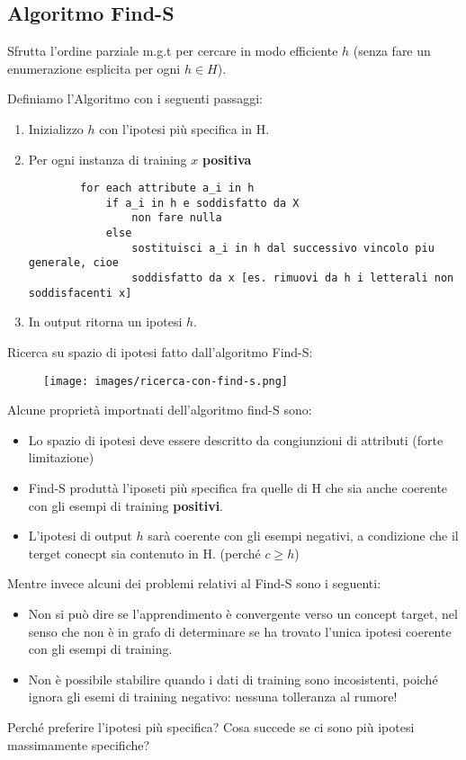 \subsection{Algoritmo Find-S}
Sfrutta l'ordine parziale m.g.t per cercare in modo efficiente $h$ (senza fare un enumerazione esplicita per ogni $h \in H$).
\begin{definition}
    Definiamo l'Algoritmo con i seguenti passaggi:
    \begin{enumerate}
        \item Inizializzo $h$ con l'ipotesi più specifica in H.
        \item Per ogni instanza di training $x$ \textbf{positiva}
        \begin{lstlisting}
        for each attribute a_i in h
            if a_i in h e soddisfatto da X
                non fare nulla
            else
                sostituisci a_i in h dal successivo vincolo piu generale, cioe
                soddisfatto da x [es. rimuovi da h i letterali non soddisfacenti x]
        \end{lstlisting}
        \item In output ritorna un ipotesi $h$.
    \end{enumerate}
\end{definition}
Ricerca su spazio di ipotesi fatto dall'algoritmo Find-S:
\begin{figure}[h!]
    \centering
    \texttt{[image: images/ricerca-con-find-s.png]}
\end{figure}

\hspace{-15pt}Alcune proprietà importnati dell'algoritmo find-S sono:
\begin{itemize}
    \item Lo spazio di ipotesi deve essere descritto da congiunzioni di attributi (forte limitazione)
    \item Find-S produttà l'iposeti più specifica fra quelle di H che sia anche coerente con gli esempi di training \textbf{positivi}.
    \item L'ipotesi di output $h$ sarà coerente con gli esempi negativi, a condizione che il terget conecpt sia contenuto in H. (perché $c \geq h$)
\end{itemize}
Mentre invece alcuni dei problemi relativi al Find-S sono i seguenti:
\begin{itemize}
    \item Non si può dire se l'apprendimento è convergente verso un concept target, nel senso
    che non è in grafo di determinare se ha trovato l'unica ipotesi coerente con gli esempi di training.
    \item Non è possibile stabilire quando i dati di training sono incosistenti, poiché ignora gli esemi di training negativo: nessuna tolleranza al rumore!
\end{itemize}
Perché preferire l’ipotesi più specifica? Cosa succede se ci sono più ipotesi massimamente specifiche?

